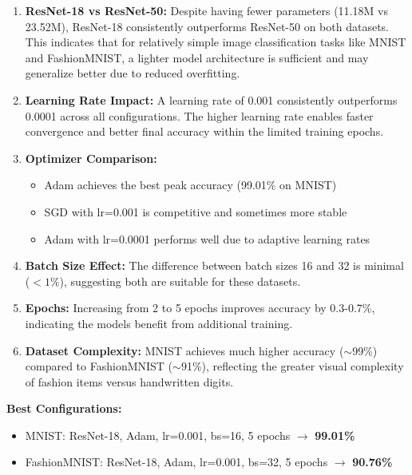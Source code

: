 \documentclass[11pt,a4paper]{article}
\begin{document}
\begin{enumerate}
    \item \textbf{ResNet-18 vs ResNet-50:} Despite having fewer parameters (11.18M vs 23.52M), ResNet-18 consistently outperforms ResNet-50 on both datasets. This indicates that for relatively simple image classification tasks like MNIST and FashionMNIST, a lighter model architecture is sufficient and may generalize better due to reduced overfitting.
    
    \item \textbf{Learning Rate Impact:} A learning rate of 0.001 consistently outperforms 0.0001 across all configurations. The higher learning rate enables faster convergence and better final accuracy within the limited training epochs.
    
    \item \textbf{Optimizer Comparison:} 
    \begin{itemize}
        \item Adam achieves the best peak accuracy (99.01\% on MNIST)
        \item SGD with lr=0.001 is competitive and sometimes more stable
        \item Adam with lr=0.0001 performs well due to adaptive learning rates
    \end{itemize}
    
    \item \textbf{Batch Size Effect:} The difference between batch sizes 16 and 32 is minimal ($<1\%$), suggesting both are suitable for these datasets.
    
    \item \textbf{Epochs:} Increasing from 2 to 5 epochs improves accuracy by 0.3-0.7\%, indicating the models benefit from additional training.
    
    \item \textbf{Dataset Complexity:} MNIST achieves much higher accuracy ($\sim$99\%) compared to FashionMNIST ($\sim$91\%), reflecting the greater visual complexity of fashion items versus handwritten digits.
\end{enumerate}

\textbf{Best Configurations:}
\begin{itemize}
    \item MNIST: ResNet-18, Adam, lr=0.001, bs=16, 5 epochs $\rightarrow$ \textbf{99.01\%}
    \item FashionMNIST: ResNet-18, Adam, lr=0.001, bs=32, 5 epochs $\rightarrow$ \textbf{90.76\%}
\end{itemize}
\end{document}

